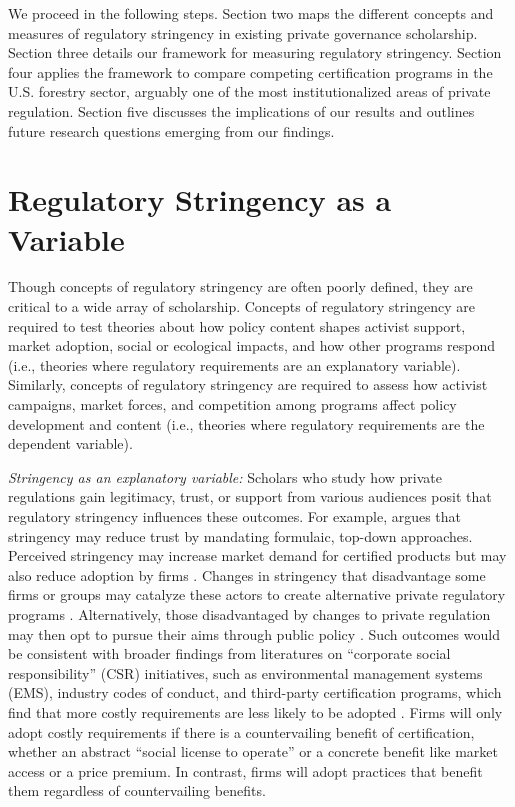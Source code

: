 \documentclass[
      12pt,
            Review ]{article}
\begin{document}
We proceed in the following steps. Section two maps the different concepts and measures of regulatory stringency in existing private governance scholarship. Section three details our framework for measuring regulatory stringency. Section four applies the framework to compare competing certification programs in the U.S. forestry sector, arguably one of the most institutionalized areas of private regulation. Section five discusses the implications of our results and outlines future research questions emerging from our findings.

\hypertarget{regulatory-stringency-as-a-variable}{%
\section{Regulatory Stringency as a Variable}\label{regulatory-stringency-as-a-variable}}

Though concepts of regulatory stringency are often poorly defined, they are critical to a wide array of scholarship. Concepts of regulatory stringency are required to test theories about how policy content shapes activist support, market adoption, social or ecological impacts, and how other programs respond (i.e., theories where regulatory requirements are an explanatory variable). Similarly, concepts of regulatory stringency are required to assess how activist campaigns, market forces, and competition among programs affect policy development and content (i.e., theories where regulatory requirements are the dependent variable).

\emph{Stringency as an explanatory variable:} Scholars who study how private regulations gain legitimacy, trust, or support from various audiences posit that regulatory stringency influences these outcomes. For example, \citet{McDermott2012} argues that stringency may reduce trust by mandating formulaic, top-down approaches. Perceived stringency may increase market demand for certified products \citep{Atkinson2014} but may also reduce adoption by firms \citep{Prado2013}. Changes in stringency that disadvantage some firms or groups may catalyze these actors to create alternative private regulatory programs \citep{Meidinger2003}. Alternatively, those disadvantaged by changes to private regulation may then opt to pursue their aims through public policy \citep{Weimer2006}. Such outcomes would be consistent with broader findings from literatures on ``corporate social responsibility'' (CSR) initiatives, such as environmental management systems (EMS), industry codes of conduct, and third-party certification programs, which find that more costly requirements are less likely to be adopted \citep{Delmas2008, Kollman2001, Lyon2008}. Firms will only adopt costly requirements if there is a countervailing benefit of certification, whether an abstract ``social license to operate'' or a concrete benefit like market access or a price premium. In contrast, firms will adopt practices that benefit them regardless of countervailing benefits.
\end{document}
